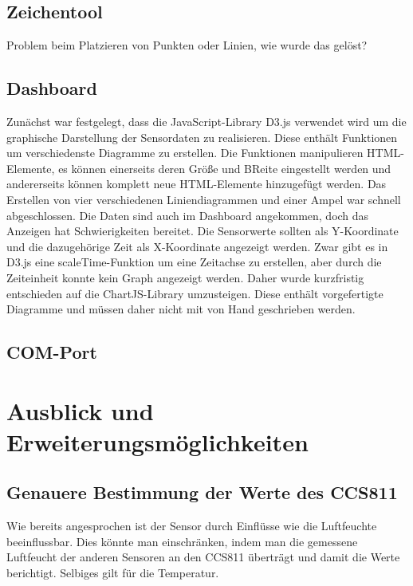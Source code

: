 \documentclass[]{article}
\begin{document}
			\subsection{Zeichentool}
			Problem beim Platzieren von Punkten oder Linien, wie wurde das gelöst? 
			
			\subsection{Dashboard}
			Zunächst war festgelegt, dass die JavaScript-Library D3.js verwendet wird um die graphische Darstellung der Sensordaten zu realisieren. Diese enthält Funktionen um verschiedenste Diagramme zu erstellen. Die Funktionen manipulieren HTML-Elemente, es können einerseits deren Größe und BReite eingestellt werden und andererseits können komplett neue HTML-Elemente hinzugefügt werden. Das Erstellen von vier verschiedenen Liniendiagrammen und einer Ampel war schnell abgeschlossen. Die Daten sind auch im Dashboard angekommen, doch das Anzeigen hat Schwierigkeiten bereitet. %
			Die Sensorwerte sollten als Y-Koordinate und die dazugehörige Zeit als X-Koordinate angezeigt werden. Zwar gibt es in D3.js eine scaleTime-Funktion um eine Zeitachse zu erstellen, aber durch die Zeiteinheit konnte kein Graph angezeigt werden.\newline
			Daher wurde kurzfristig entschieden auf die ChartJS-Library umzusteigen. Diese enthält vorgefertigte Diagramme und müssen daher nicht mit von Hand geschrieben werden. %
			
			\subsection{COM-Port}
	
	\section{Ausblick und Erweiterungsmöglichkeiten}
		\subsection{Genauere Bestimmung der Werte des CCS811}
			Wie bereits angesprochen ist der Sensor durch Einflüsse wie die Luftfeuchte beeinflussbar. Dies könnte man einschränken, indem man die gemessene Luftfeucht  der anderen Sensoren an den CCS811 überträgt und damit die Werte berichtigt. Selbiges gilt für die Temperatur. 
		
		

\printbibliography
\end{document}
